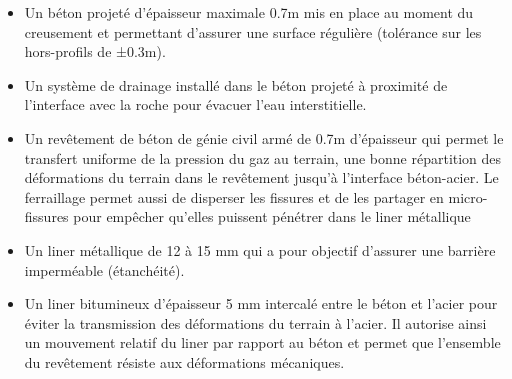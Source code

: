 \documentclass[11pt,french,a4paper]{article}
\begin{document}
\begin{itemize}
\item Un béton projeté d’épaisseur maximale 0.7m mis en place au moment du creusement et permettant d’assurer une surface régulière (tolérance sur les hors-profils de ±0.3m).
\item Un système de drainage installé dans le béton projeté à proximité de l'interface avec la roche pour évacuer l'eau interstitielle.
\item Un revêtement de béton de génie civil armé de 0.7m d'épaisseur qui permet le transfert  uniforme de la pression du gaz au terrain, une bonne répartition des déformations du terrain dans le revêtement jusqu’à l’interface béton-acier. Le ferraillage permet aussi de disperser les fissures et de les partager en micro-fissures pour empêcher qu’elles puissent pénétrer dans le liner métallique 
\item Un liner métallique de 12 à 15 mm qui a pour objectif d'assurer une barrière imperméable (étanchéité).
\item Un liner bitumineux d'épaisseur 5 mm intercalé entre le béton et l’acier pour éviter la transmission des déformations du terrain à l’acier. Il autorise ainsi un mouvement relatif du liner par rapport au béton et permet que l’ensemble du revêtement résiste aux déformations mécaniques.
\end{itemize}
\end{document}
